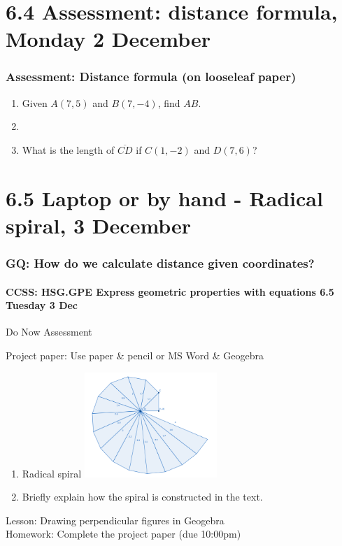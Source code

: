 \documentclass{beamer}
\begin{document}
\section{6.4 Assessment: distance formula, Monday 2 December}
\frame
{
  \frametitle{Assessment: Distance formula (on looseleaf paper)}
  \begin{enumerate}
    \item Given $A(7,5)$ and $B(7,-4)$, find $AB$. \hspace{0.5cm}
      \vspace{0.5cm}
    \item 
    \item What is the length of $\overline{CD}$ if $C(1,-2)$ and $D(7,6)$?
  \end{enumerate}
}

\section{6.5 Laptop or by hand - Radical spiral, 3 December}
\frame
{
\frametitle{GQ: How do we calculate distance given coordinates?}
\framesubtitle{CCSS: HSG.GPE Express geometric properties with equations \hfill \alert{6.5 Tuesday 3 Dec}}

Do Now Assessment
\begin{block}{Project paper: Use paper \& pencil or MS Word \& Geogebra}
\begin{enumerate}
  \item Radical spiral
  \includegraphics[width=5cm]{6-5CW_Radical-spiral.png}
  \item Briefly explain how the spiral is constructed in the text.
\end{enumerate}
\end{block}
Lesson: Drawing perpendicular figures in Geogebra\\[0.25cm]
Homework: Complete the project paper (due 10:00pm)
}
\end{document}
